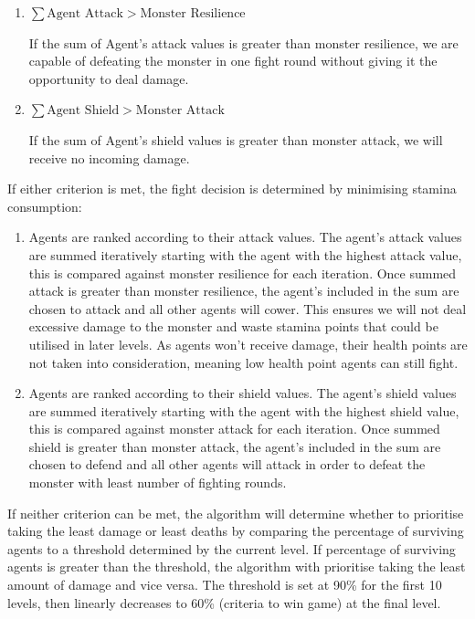 \begin{enumerate}
    \item
          $\sum{\text{Agent Attack}} > \text{Monster Resilience}$

          If the sum of Agent's attack values is greater than monster resilience, we are capable of defeating the monster in one fight round without giving it the opportunity to deal damage.

    \item
          $\sum{\text{Agent Shield}} > \text{Monster Attack}$

          If the sum of Agent's shield values is greater than monster attack, we will receive no incoming damage.
\end{enumerate}

If either criterion is met, the fight decision is determined by minimising stamina consumption:

\begin{enumerate}
    \item  Agents are ranked according to their attack values. The agent's attack values are summed iteratively starting with the agent with the highest attack value, this is compared against monster resilience for each iteration. Once summed attack is greater than monster resilience, the agent's included in the sum are chosen to attack and all other agents will cower. This ensures we will not deal excessive damage to the monster and waste stamina points that could be utilised in later levels. As agents won't receive damage, their health points are not taken into consideration, meaning low health point agents can still fight.
    \item  Agents are ranked according to their shield values. The agent's shield values are summed iteratively starting with the agent with the highest shield value, this is compared against monster attack for each iteration. Once summed shield is greater than monster attack, the agent's included in the sum are chosen to defend and all other agents will attack in order to defeat the monster with least number of fighting rounds.
\end{enumerate}

If neither criterion can be met, the algorithm will determine whether to prioritise taking the least damage or least deaths by comparing the percentage of surviving agents to a threshold determined by the current level. If percentage of surviving agents is greater than the threshold, the algorithm with prioritise taking the least amount of damage and vice versa. The threshold is set at 90\% for the first 10 levels, then linearly decreases to 60\% (criteria to win game) at the final level.


